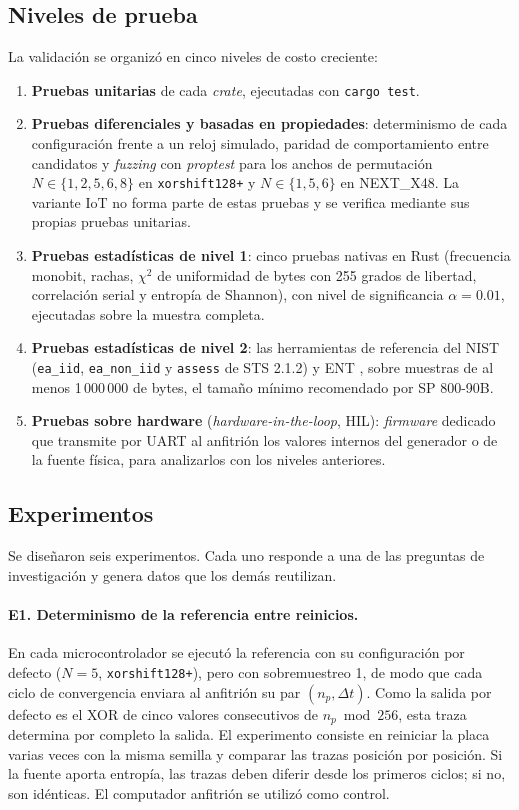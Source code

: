 \subsection{Niveles de prueba}

La validación se organizó en cinco niveles de costo creciente:

\begin{enumerate}
    \item \textbf{Pruebas unitarias} de cada \textit{crate}, ejecutadas con \texttt{cargo test}.
    \item \textbf{Pruebas diferenciales y basadas en propiedades}: determinismo de cada configuración frente a un reloj simulado, paridad de comportamiento entre candidatos y \textit{fuzzing} con \textit{proptest} para los anchos de permutación $N \in \{1, 2, 5, 6, 8\}$ en \texttt{xorshift128+} y $N \in \{1, 5, 6\}$ en NEXT\_X48. La variante IoT no forma parte de estas pruebas y se verifica mediante sus propias pruebas unitarias.
    \item \textbf{Pruebas estadísticas de nivel 1}: cinco pruebas nativas en Rust (frecuencia monobit, rachas, $\chi^2$ de uniformidad de bytes con 255 grados de libertad, correlación serial y entropía de Shannon), con nivel de significancia $\alpha = 0.01$, ejecutadas sobre la muestra completa.
    \item \textbf{Pruebas estadísticas de nivel 2}: las herramientas de referencia del NIST (\texttt{ea\_iid}, \texttt{ea\_non\_iid} y \texttt{assess} de STS 2.1.2) y ENT \cite{Walker2008ENT:Program}, sobre muestras de al menos 1\,000\,000 de bytes, el tamaño mínimo recomendado por SP 800-90B.
    \item \textbf{Pruebas sobre hardware} (\textit{hardware-in-the-loop}, HIL): \textit{firmware} dedicado que transmite por UART al anfitrión los valores internos del generador o de la fuente física, para analizarlos con los niveles anteriores.
\end{enumerate}

\subsection{Experimentos}
\label{sec:experimentos}

Se diseñaron seis experimentos. Cada uno responde a una de las preguntas de investigación y genera datos que los demás reutilizan.

\paragraph{E1. Determinismo de la referencia entre reinicios.} En cada microcontrolador se ejecutó la referencia con su configuración por defecto ($N = 5$, \texttt{xorshift128+}), pero con sobremuestreo 1, de modo que cada ciclo de convergencia enviara al anfitrión su par $(n_p, \Delta t)$. Como la salida por defecto es el XOR de cinco valores consecutivos de $n_p \bmod 256$, esta traza determina por completo la salida. El experimento consiste en reiniciar la placa varias veces con la misma semilla y comparar las trazas posición por posición. Si la fuente aporta entropía, las trazas deben diferir desde los primeros ciclos; si no, son idénticas. El computador anfitrión se utilizó como control.

